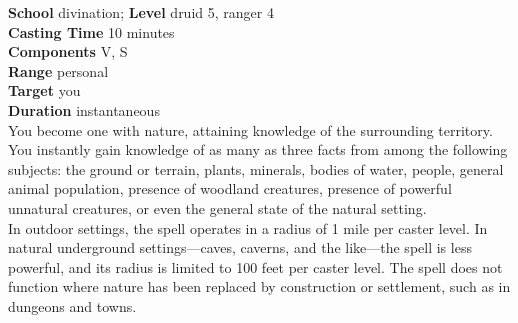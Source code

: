 \textbf{School} divination; \textbf{Level} druid 5, ranger 4\\
\textbf{Casting Time} 10 minutes\\
\textbf{Components} V, S\\
\textbf{Range} personal\\
\textbf{Target} you\\
\textbf{Duration} instantaneous\\
You become one with nature, attaining knowledge of the surrounding territory. You instantly gain knowledge of as many as three facts from among the following subjects: the ground or terrain, plants, minerals, bodies of water, people, general animal population, presence of woodland creatures, presence of powerful unnatural creatures, or even the general state of the natural setting.\\
In outdoor settings, the spell operates in a radius of 1 mile per caster level. In natural underground settings---caves, caverns, and the like---the spell is less powerful, and its radius is limited to 100 feet per caster level. The spell does not function where nature has been replaced by construction or settlement, such as in dungeons and towns.\\
